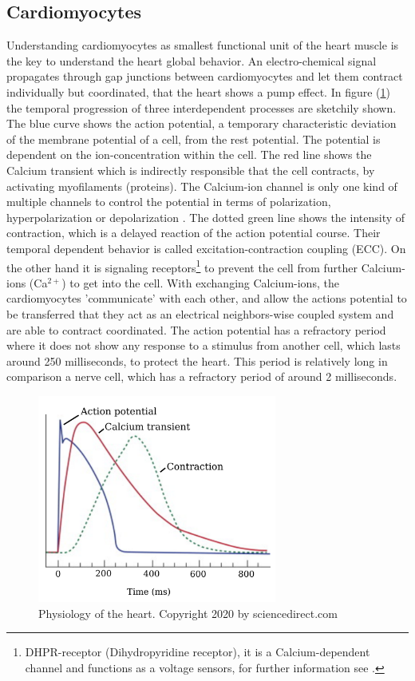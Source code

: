 \subsection{Cardiomyocytes}
Understanding cardiomyocytes as smallest functional unit of the heart muscle is the key to understand the heart global behavior. An electro-chemical signal propagates through gap junctions between cardiomyocytes and let them contract individually but coordinated, that the heart shows a pump effect.
In figure (\ref{fig:cardiac_excitation}) the temporal progression of three interdependent processes are sketchily shown. The blue curve shows the action potential, a temporary characteristic deviation of the membrane potential of a cell, from the rest potential. The potential is dependent on the ion-concentration within the cell. The red line shows the Calcium transient which is indirectly responsible that the cell contracts, by activating myofilaments (proteins). The Calcium-ion channel is only one kind of multiple channels to control the potential in terms of polarization, hyperpolarization or depolarization \cite{mycardium_lecture}.
The dotted green line shows the intensity of contraction, which is a delayed reaction of the action potential course. Their temporal dependent behavior is called excitation-contraction coupling (ECC).  On the other hand it is signaling receptors\footnote{DHPR-receptor (Dihydropyridine receptor), it is a Calcium-dependent channel and functions as a voltage sensors, for further information see \cite{woodcock_cardiomyocytes_2005}.} to prevent the cell from further Calcium-ions (Ca$^{2+}$) to get into the cell. With exchanging Calcium-ions, the cardiomyocytes 'communicate' with each other, and allow the actions potential to be transferred that they act as an electrical neighbors-wise coupled system and are able to contract coordinated.
The action potential has a refractory period where it does not show any response to a stimulus from another cell, which lasts around 250 milliseconds, to protect the heart. This period is relatively long in comparison a nerve cell, which has a refractory period of around 2 milliseconds. 

\begin{figure}[ht]
    \center
    \includegraphics[width=0.7\textwidth]{figures/caradio_excitation.png}
	\caption{Physiology of the heart. Copyright 2020 by sciencedirect.com}
	\label{fig:cardiac_excitation}
\end{figure}

